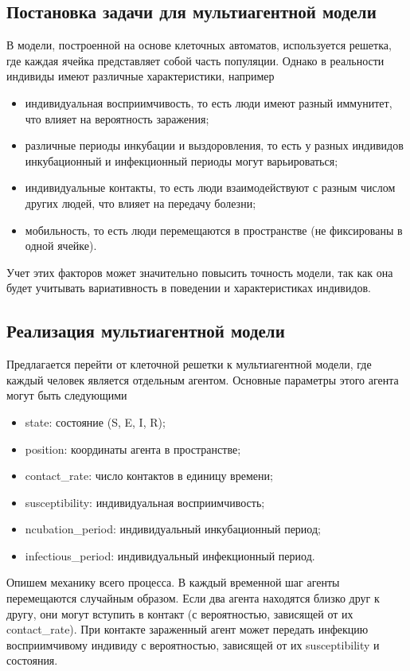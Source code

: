 \documentclass[a4paper, 14pt]{extreport}
\numberwithin{equation}{section}
\begin{document}
	\subsection{Постановка задачи для мультиагентной модели}
	В модели, построенной на основе клеточных автоматов, используется решетка, где каждая ячейка представляет собой часть популяции. Однако в реальности индивиды имеют различные характеристики, например
	\begin{itemize}
		\item индивидуальная восприимчивость, то есть люди имеют разный иммунитет, что влияет на вероятность заражения;
		\item различные периоды инкубации и выздоровления, то есть у разных индивидов инкубационный и инфекционный периоды могут варьироваться;
		\item индивидуальные контакты, то есть люди взаимодействуют с разным числом других людей, что влияет на передачу болезни;
		\item мобильность, то есть люди перемещаются в пространстве (не фиксированы в одной ячейке).
	\end{itemize}
	
	Учет этих факторов может значительно повысить точность модели, так как она будет учитывать вариативность в поведении и характеристиках индивидов.
	
	\subsection{Реализация мультиагентной модели}
	
	Предлагается перейти от клеточной решетки к мультиагентной модели, где каждый человек является отдельным агентом. Основные параметры этого агента могут быть следующими
	\begin{itemize}
		\item state: состояние (S, E, I, R);
		\item position: координаты агента в пространстве;
		\item contact\_rate: число контактов в единицу времени;
		\item susceptibility: индивидуальная восприимчивость;
		\item ncubation\_period: индивидуальный инкубационный период;
		\item infectious\_period: индивидуальный инфекционный период.
	\end{itemize}
	
	Опишем механику всего процесса. В каждый временной шаг агенты перемещаются случайным образом. Если два агента находятся близко друг к другу, они могут вступить в контакт (с вероятностью, зависящей от их contact\_rate).
	При контакте зараженный агент может передать инфекцию восприимчивому индивиду с вероятностью, зависящей от их susceptibility и состояния.
	
\end{document}
